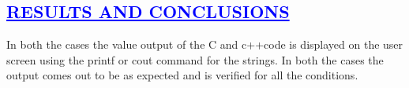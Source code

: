\documentclass[a4paper,12pt]{report}
\begin{document}
\begin{center}
\chapter{\textcolor{blue}{\underline {RESULTS AND CONCLUSIONS}}}\end{center}

\noindent In both the cases the value output of the C and c++code is displayed on the user screen using the printf or cout command for the strings. In both the cases the output comes out to  be as expected and is verified for all the conditions.
\end{document}
